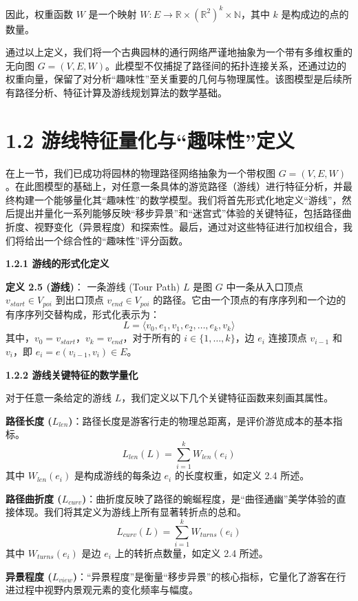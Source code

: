 \documentclass[11pt]{article}
\theoremstyle{definition}
\begin{document}
因此，权重函数 $W$ 是一个映射 $W: E \to \mathbb{R} \times (\mathbb{R}^2)^k \times \mathbb{N}$，其中 $k$ 是构成边的点的数量。

通过以上定义，我们将一个古典园林的通行网络严谨地抽象为一个带有多维权重的无向图 $G=(V, E, W)$。此模型不仅捕捉了路径间的拓扑连接关系，还通过边的权重向量，保留了对分析“趣味性”至关重要的几何与物理属性。该图模型是后续所有路径分析、特征计算及游线规划算法的数学基础。



\section*{1.2 游线特征量化与“趣味性”定义}	


在上一节，我们已成功将园林的物理路径网络抽象为一个带权图 $G=(V, E, W)$。在此图模型的基础上，对任意一条具体的游览路径（游线）进行特征分析，并最终构建一个能够量化其“趣味性”的数学模型。我们将首先形式化地定义“游线”，然后提出并量化一系列能够反映“移步异景”和“迷宫式”体验的关键特征，包括路径曲折度、视野变化（异景程度）和探索性。最后，通过对这些特征进行加权组合，我们将给出一个综合性的“趣味性”评分函数。

\textbf{1.2.1 游线的形式化定义}

\textbf{定义 2.5 (游线)}： 一条游线 (Tour Path) $L$ 是图 $G$ 中一条从入口顶点 $v_{start} \in V_{poi}$ 到出口顶点 $v_{end} \in V_{poi}$ 的路径。它由一个顶点的有序序列和一个边的有序序列交替构成，形式化表示为：
$$ L = \langle v_0, e_1, v_1, e_2, \dots, e_k, v_k \rangle $$
其中，$v_0 = v_{start}$，$v_k = v_{end}$，对于所有的 $i \in \{1, \dots, k\}$，边 $e_i$ 连接顶点 $v_{i-1}$ 和 $v_i$，即 $e_i = e(v_{i-1}, v_i) \in E$。

\textbf{1.2.2 游线关键特征的数学量化}

对于任意一条给定的游线 $L$，我们定义以下几个关键特征函数来刻画其属性。

\textbf{路径长度 ($L_{len}$)}：路径长度是游客行走的物理总距离，是评价游览成本的基本指标。
$$ L_{len}(L) = \sum_{i=1}^{k} W_{len}(e_i) $$
其中 $W_{len}(e_i)$ 是构成游线的每条边 $e_i$ 的长度权重，如定义 2.4 所述。

\textbf{路径曲折度 ($L_{curv}$)}：曲折度反映了路径的蜿蜒程度，是“曲径通幽”美学体验的直接体现。我们将其定义为游线上所有显著转折点的总和。
$$ L_{curv}(L) = \sum_{i=1}^{k} W_{turns}(e_i) $$
其中 $W_{turns}(e_i)$ 是边 $e_i$ 上的转折点数量，如定义 2.4 所述。

\textbf{异景程度 ($L_{view}$)}：“异景程度”是衡量“移步异景”的核心指标，它量化了游客在行进过程中视野内景观元素的变化频率与幅度。
\end{document}
